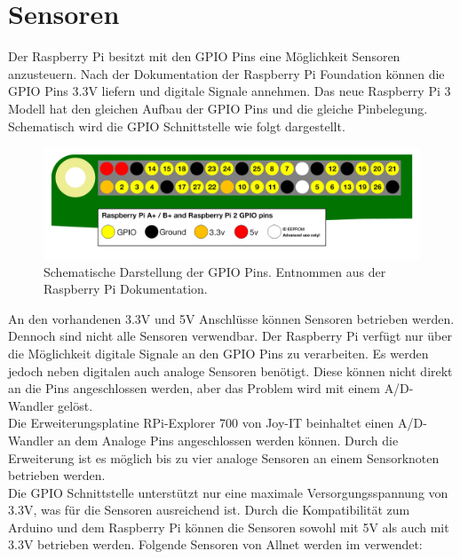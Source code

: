 \section{Sensoren}\label{Sensoren_Planung}
Der Raspberry Pi besitzt mit den \ac{GPIO} Pins eine Möglichkeit Sensoren anzusteuern. Nach der Dokumentation der Raspberry Pi Foundation\cite{GPIOMode77:online} können die \ac{GPIO} Pins 3.3V liefern und digitale Signale annehmen. Das neue Raspberry Pi 3 Modell hat den gleichen Aufbau der \ac{GPIO} Pins und die gleiche Pinbelegung. Schematisch wird die \ac{GPIO} Schnittstelle wie folgt dargestellt.
\begin{figure}[ht]
	\includegraphics[width=\textwidth]{Bilder/Kapitel2/gpio_pins_pi2.png}
	\caption[Schema GPIO Pins]{Schematische Darstellung der GPIO Pins. Entnommen aus der Raspberry Pi Dokumentation\cite{GPIOMode77:online}.}
	\label{fig:Kapitel2/gpio_pins_pi2.png}
\end{figure}
\noindent
An den vorhandenen 3.3V und 5V Anschlüsse können Sensoren betrieben werden. Dennoch sind nicht alle Sensoren verwendbar. Der Raspberry Pi verfügt nur über die Möglichkeit digitale Signale an den \ac{GPIO} Pins zu verarbeiten. Es werden jedoch neben digitalen auch analoge Sensoren benötigt. Diese können nicht direkt an die Pins angeschlossen werden, aber das Problem wird mit einem \ac{A/D-Wandler} gelöst. \\
Die Erweiterungsplatine RPi-Explorer 700 von Joy-IT \cite{joyitrpi87:online} beinhaltet einen \ac{A/D-Wandler} an dem Analoge Pins angeschlossen werden können. Durch die Erweiterung ist es möglich bis zu vier analoge Sensoren an einem Sensorknoten betrieben werden. \\
Die \ac{GPIO} Schnittstelle unterstützt nur eine maximale Versorgungsspannung von 3.3V, was für die Sensoren ausreichend ist. Durch die Kompatibilität zum Arduino und dem Raspberry Pi können die Sensoren sowohl mit 5V als auch mit 3.3V betrieben werden.
Folgende Sensoren von Allnet\cite{111861pd90:online} werden  im  verwendet:
